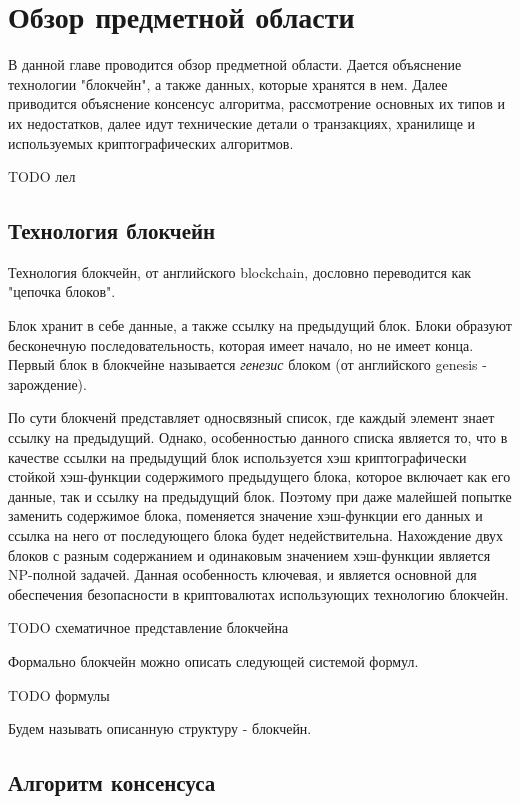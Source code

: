 
\startrelatedwork

\chapter{Обзор предметной области}
В данной главе проводится обзор предметной области.
Дается объяснение технологии "блокчейн", а также данных, которые хранятся в нем.
Далее приводится объяснение консенсус алгоритма, рассмотрение основных их типов и их недостатков, далее идут технические детали о транзакциях, хранилище и используемых криптографических алгоритмов.

TODO лел

\section{Технология блокчейн}

Технология блокчейн, от английского blockchain, дословно переводится  как "цепочка блоков".

Блок хранит в себе данные, а также ссылку на предыдущий блок. 
Блоки образуют бесконечную последовательность, которая имеет начало, но не имеет конца.
Первый блок в блокчейне называется \textit{генезис} блоком (от английского genesis - зарождение).

По сути блокченй представляет односвязный список, где каждый элемент знает ссылку на предыдущий. 
Однако, особенностью данного списка является то,  что в качестве ссылки на предыдущий блок 
используется хэш криптографически стойкой хэш-функции содержимого предыдущего блока, 
которое включает как его данные, так и ссылку на предыдущий блок. 
Поэтому при даже малейшей попытке заменить содержимое блока, 
поменяется значение хэш-функции его данных и ссылка на него от последующего блока будет недействительна.
Нахождение двух блоков с разным содержанием и одинаковым значением хэш-функции является NP-полной задачей.
Данная особенность ключевая, и  является основной для обеспечения безопасности в криптовалютах использующих технологию блокчейн.

TODO схематичное представление блокчейна

Формально блокчейн можно описать следующей системой формул.

TODO формулы

Будем называть описанную структуру - блокчейн.

\section{Алгоритм консенсуса}

